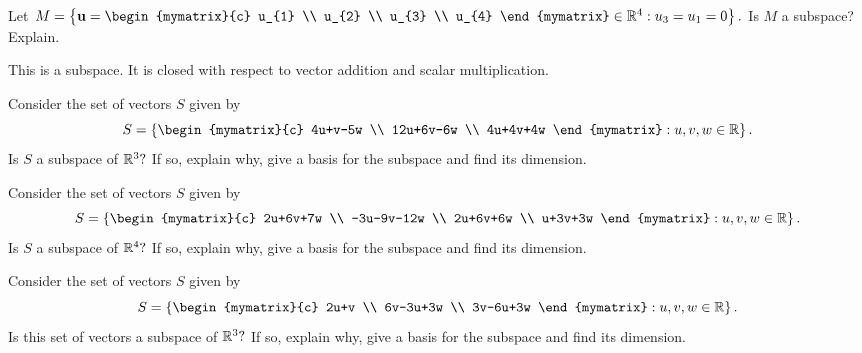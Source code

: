 \begin{enumialphparenastyle}
\begin{ex} Let $M=\left\{ \vect{u}=\begin{mymatrix}{c}
u_{1} \\
u_{2} \\
u_{3} \\
u_{4}
\end{mymatrix} \in 
\R^{4}:u_{3}=u_{1}=0\right\} .$ Is $M$ a subspace? Explain.
\begin{sol}
This is a subspace. It is closed with respect to vector addition and scalar
multiplication.
\end{sol}
\end{ex}

\begin{ex} Consider the set of vectors $S$ given by  
\begin{equation*}
S = 
\left\{ \begin{mymatrix}{c}
4u+v-5w \\ 
12u+6v-6w \\ 
4u+4v+4w
\end{mymatrix} :u,v,w\in \R\right\} .
\end{equation*}
Is $S$ a subspace of $\mathbb{R}^{3}?$ If so, explain why,
give a basis for the subspace and find its dimension.
\end{ex}

\begin{ex} Consider the set of vectors $S$ given by 
\begin{equation*}
S = 
\left\{ \begin{mymatrix}{c}
2u+6v+7w \\ 
-3u-9v-12w \\ 
2u+6v+6w \\ 
u+3v+3w
\end{mymatrix} :u,v,w\in \R\right\} .
\end{equation*}
Is $S$ a subspace of $\mathbb{R}^{4}?$ If so, explain why,
give a basis for the subspace and find its dimension.
\end{ex}

\begin{ex} Consider the set of vectors $S$ given by 
\begin{equation*}
S = 
\left\{ \begin{mymatrix}{c}
2u+v \\ 
6v-3u+3w \\ 
3v-6u+3w
\end{mymatrix} :u,v,w\in \R\right\} .
\end{equation*}
Is this set of vectors a subspace of $\mathbb{R}^{3}?$ If so, explain why,
give a basis for the subspace and find its dimension.
\end{ex}


\end{enumialphparenastyle}
